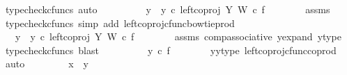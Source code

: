 \begin{isabellebody}
\ {\isacharparenleft}{\kern0pt}typecheck{\isacharunderscore}{\kern0pt}cfuncs{\isacharcomma}{\kern0pt}\ auto{\isacharparenright}{\kern0pt}\isanewline
\ \ \ \ \isamarkupfalse%
\ \isamarkupfalse%
\ {\isachardoublequoteopen}{\isachardot}{\kern0pt}{\isachardot}{\kern0pt}{\isachardot}{\kern0pt}\ {\isacharequal}{\kern0pt}\ {\isacharparenleft}{\kern0pt}y{}\ {\isasymamalg}\ y{}{\isacharparenright}{\kern0pt}\ {\isasymcirc}\isactrlsub c\ left{\isacharunderscore}{\kern0pt}coproj\ Y\ W\ {\isasymcirc}\isactrlsub c\ f{\isachardoublequoteclose}\isanewline
\ \ \ \ \ \ \isamarkupfalse%
\ assms\ \isamarkupfalse%
\ {\isacharparenleft}{\kern0pt}typecheck{\isacharunderscore}{\kern0pt}cfuncs{\isacharcomma}{\kern0pt}\ simp\ add{\isacharcolon}{\kern0pt}\ left{\isacharunderscore}{\kern0pt}coproj{\isacharunderscore}{\kern0pt}cfunc{\isacharunderscore}{\kern0pt}bowtie{\isacharunderscore}{\kern0pt}prod{\isacharparenright}{\kern0pt}\isanewline
\ \ \ \ \isamarkupfalse%
\ \isamarkupfalse%
\ {\isachardoublequoteopen}{\isachardot}{\kern0pt}{\isachardot}{\kern0pt}{\isachardot}{\kern0pt}\ {\isacharequal}{\kern0pt}\ {\isacharparenleft}{\kern0pt}{\isacharparenleft}{\kern0pt}y{}\ {\isasymamalg}\ y{}{\isacharparenright}{\kern0pt}\ {\isasymcirc}\isactrlsub c\ left{\isacharunderscore}{\kern0pt}coproj\ Y\ W{\isacharparenright}{\kern0pt}\ {\isasymcirc}\isactrlsub c\ f{\isachardoublequoteclose}\isanewline
\ \ \ \ \ \ \isamarkupfalse%
\ assms\ comp{\isacharunderscore}{\kern0pt}associative{}\ y{\isacharunderscore}{\kern0pt}expand\ y{\isacharunderscore}{\kern0pt}type\ \isamarkupfalse%
\ {\isacharparenleft}{\kern0pt}typecheck{\isacharunderscore}{\kern0pt}cfuncs{\isacharcomma}{\kern0pt}\ blast{\isacharparenright}{\kern0pt}\isanewline
\ \ \ \ \isamarkupfalse%
\ \isamarkupfalse%
\ {\isachardoublequoteopen}{\isachardot}{\kern0pt}{\isachardot}{\kern0pt}{\isachardot}{\kern0pt}\ {\isacharequal}{\kern0pt}\ y{}\ {\isasymcirc}\isactrlsub c\ f{\isachardoublequoteclose}\isanewline
\ \ \ \ \ \ \isamarkupfalse%
\ y{}{\isacharunderscore}{\kern0pt}y{}{\isacharunderscore}{\kern0pt}type\ left{\isacharunderscore}{\kern0pt}coproj{\isacharunderscore}{\kern0pt}cfunc{\isacharunderscore}{\kern0pt}coprod\ \isamarkupfalse%
\ auto\ \isanewline
\ \ \ \ \isamarkupfalse%
\ \isamarkupfalse%
\ {\isachardoublequoteopen}x{}\ {\isacharequal}{\kern0pt}\ y{}{\isachardoublequoteclose}\isanewline

\end{isabellebody}
